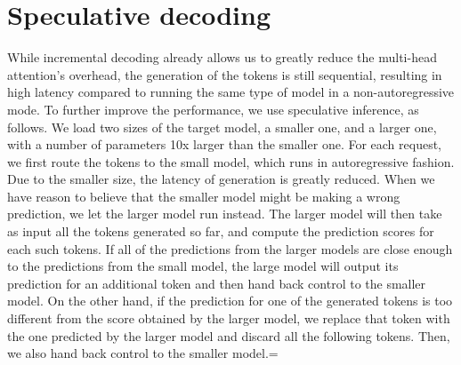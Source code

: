 \section{Speculative decoding}

While incremental decoding already allows us to greatly reduce the multi-head attention's overhead, the generation of the tokens is still sequential, resulting in high latency compared to running the same type of model in a non-autoregressive mode. To further improve the performance, we use speculative inference, as follows. We load two sizes of the target model, a smaller one, and a larger one, with a number of parameters 10x larger than the smaller one. For each request, we first route the tokens to the small model, which runs in autoregressive fashion. Due to the smaller size, the latency of generation is greatly reduced. When we have reason to believe that the smaller model might be making a wrong prediction, we let the larger model run instead. The larger model will then take as input all the tokens generated so far, and compute the prediction scores for each such tokens. If all of the predictions from the larger models are close enough to the predictions from the small model, the large model will output its prediction for an additional token and then hand back control to the smaller model. On the other hand, if the prediction for one of the generated tokens is too different from the score obtained by the larger model, we replace that token with the one predicted by the larger model and discard all the following tokens. Then, we also hand back control to the smaller model.=
